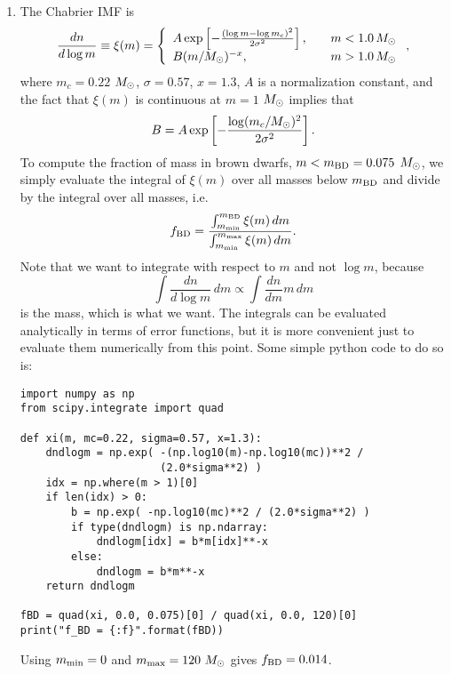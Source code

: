 \begin{enumerate}
\begin{enumerate}
\item The Chabrier IMF is
\begin{displaymath}
\frac{dn}{d\log m} \equiv \xi(m) =
\left\{
\begin{array}{ll}
A \exp \left[-\frac{(\log m -\log m_c)^2}{2\sigma^2}\right], \quad & m<1.0\,M_{\odot} \\
B (m/M_{\odot})^{-x}, & m>1.0\, M_{\odot}
\end{array}
\right.,
\end{displaymath}
where $m_c = 0.22$ $M_{\odot}$, $\sigma = 0.57$, $x=1.3$, $A$ is a normalization constant, and the fact that $\xi(m)$ is continuous at $m=1$ $M_{\odot}$ implies that
\begin{displaymath}
B = A \exp \left[-\frac{\log (m_c/M_{\odot})^2}{2\sigma^2}\right].
\end{displaymath}
To compute the fraction of mass in brown dwarfs, $m<m_{\rm BD} =0.075$ $M_{\odot}$, we simply evaluate the integral of $\xi(m)$ over all masses below $m_{\rm BD}$ and divide by the integral over all masses, i.e.
\begin{displaymath}
f_{\rm BD} = \frac{\int_{m_{\rm min}}^{m_{\rm BD}} \xi(m) \, dm}{\int_{m_{\rm min}}^{m_{\rm max}} \xi(m) \, dm}.
\end{displaymath}
Note that we want to integrate with respect to $m$ and not $\log m$, because 
\begin{displaymath}
\int \frac{dn}{d\log m} \, dm \propto \int \frac{dn}{dm} m \, dm
\end{displaymath}
is the mass, which is what we want. The integrals can be evaluated analytically in terms of error functions, but it is more convenient just to evaluate them numerically from this point. Some simple python code to do so is:
\begin{verbatim}
import numpy as np
from scipy.integrate import quad

def xi(m, mc=0.22, sigma=0.57, x=1.3):
    dndlogm = np.exp( -(np.log10(m)-np.log10(mc))**2 /
                      (2.0*sigma**2) )
    idx = np.where(m > 1)[0]
    if len(idx) > 0:
        b = np.exp( -np.log10(mc)**2 / (2.0*sigma**2) )
        if type(dndlogm) is np.ndarray:
            dndlogm[idx] = b*m[idx]**-x
        else:
            dndlogm = b*m**-x
    return dndlogm

fBD = quad(xi, 0.0, 0.075)[0] / quad(xi, 0.0, 120)[0]
print("f_BD = {:f}".format(fBD))
\end{verbatim}
Using $m_{\rm min} = 0$ and $m_{\rm max} = 120~M_{\odot}$ gives $f_{\rm BD} = 0.014$.


\end{enumerate}
\end{enumerate}
